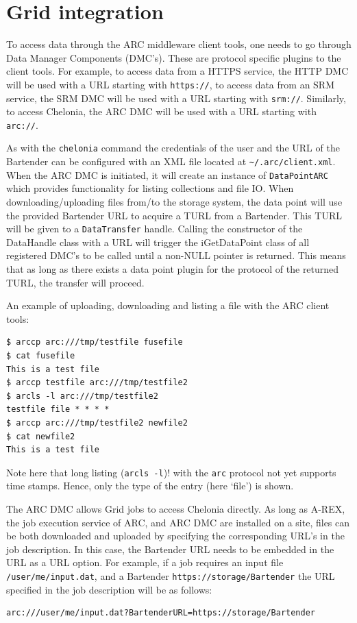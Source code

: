 \documentclass{book}
\begin{document}

\section{Grid integration} %
\label{sec:grid_integration}

To access data through the ARC middleware client tools, one needs to go through Data Manager Components (DMC's). These are protocol specific plugins to the client tools. For example, to access data from a HTTPS service, the HTTP DMC will be used with a URL starting with \verb!https://!, to access data from an SRM service, the SRM DMC will be used with a URL starting with \verb!srm://!. Similarly, to access Chelonia, the ARC DMC will be used with a URL starting with \verb!arc://!. 

As with the \verb!chelonia! command the credentials of the user and the URL of the Bartender can be configured with an XML file located at \verb!~/.arc/client.xml!. When the ARC DMC is initiated, it will create an instance of \verb!DataPointARC! which provides functionality for listing collections and file IO. When downloading/uploading files from/to the storage system, the data point will use the provided Bartender URL to acquire a TURL from a Bartender. This TURL will be given to a \verb!DataTransfer! handle. Calling the constructor of the DataHandle class with a URL will trigger the iGetDataPoint class of all registered DMC's to be called until a non-NULL pointer is returned. This means that as long as there exists a data point plugin for the protocol of the returned TURL, the transfer will proceed.

An example of uploading, downloading and listing a file with the ARC client tools:

\begin{verbatim}
$ arccp arc:///tmp/testfile fusefile
$ cat fusefile
This is a test file
$ arccp testfile arc:///tmp/testfile2
$ arcls -l arc:///tmp/testfile2
testfile file * * * *
$ arccp arc:///tmp/testfile2 newfile2
$ cat newfile2
This is a test file
\end{verbatim}

Note here that long listing (\verb!arcls -l!)! with the \verb!arc! protocol not yet supports time stamps. Hence, only the type of the entry (here `file') is shown.

The ARC DMC allows Grid jobs to access Chelonia directly. As long as A-REX, the job execution service of ARC, and ARC DMC are installed on a site, files can be both downloaded and uploaded by specifying the corresponding URL's in the job description. In this case, the Bartender URL needs to be embedded in the URL as a URL option. For example, if a job requires an input file \verb!/user/me/input.dat!, and a Bartender \verb!https://storage/Bartender! the URL specified in the job description will be as follows:
\begin{verbatim}
arc:///user/me/input.dat?BartenderURL=https://storage/Bartender
\end{verbatim}


% 
\end{document}
